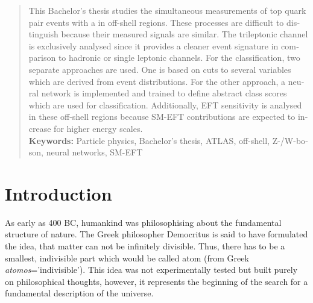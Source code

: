 \documentclass[bachelor,oneside, BCOR10mm,
			ngerman,english  %
]{GAUBM}
\begin{document}
\begin{otherlanguage}{english}
	\begin{abstract}
		This Bachelor's thesis studies the simultaneous measurements of top quark pair events with a \zwboson in off-shell regions. These processes are difficult to distinguish because their measured signals are similar. The trileptonic channel is exclusively analysed since it provides a cleaner event signature in comparison to hadronic or single leptonic channels. For the classification, two separate approaches are used. One is based on cuts to several variables which are derived from event distributions. For the other approach, a neural network is implemented and trained to define abstract class scores which are used for classification. Additionally, EFT sensitivity is analysed in these off-shell regions because SM-EFT contributions are expected to increase for higher energy scales.\vspace{3mm}\\
		\textbf{Keywords:} Particle physics, Bachelor's thesis, ATLAS, off-shell, Z-/W-boson, neural networks, SM-EFT
	\end{abstract}
\end{otherlanguage}
\cleardoublepage


\onehalfspacing
\tableofcontents
%


\mainmatter
\chapter{Introduction}
As early as 400 BC, humankind was philosophising about the fundamental structure of nature. The Greek philosopher Democritus is said to have formulated the idea, that matter can not be infinitely divisible. Thus, there has to be a smallest, indivisible part which would be called atom (from Greek \textit{atomos}='indivisible'). This idea was not experimentally tested but built purely on philosophical thoughts, however, it represents the beginning of the search for a fundamental description of the universe.
\end{document}
